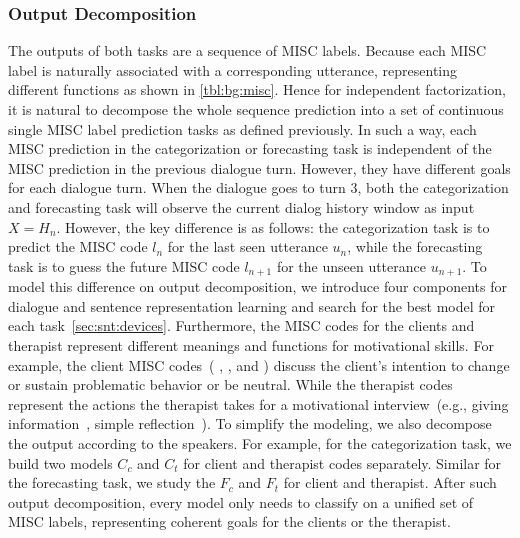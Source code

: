 \subsubsection{Output Decomposition}
\label{sssec:snt:output-decomposition}
The outputs of both tasks are a sequence of MISC labels. Because each
MISC label is naturally associated with a corresponding utterance,
representing different functions as shown in
\autoref{tbl:bg:misc}. Hence for independent factorization, it is
natural to decompose the whole sequence prediction into a set of
continuous single MISC label prediction tasks as defined
previously. In such a way, each MISC prediction in the categorization
or forecasting task is independent of the MISC prediction in the
previous dialogue turn. However, they have different goals for each
dialogue turn. When the dialogue goes to turn 3, both the
categorization and forecasting task will observe the current dialog
history window as input $X=H_{n}$. However, the key difference is as
follows: the categorization task is to predict the MISC code $l_{n}$
for the last seen utterance $u_{n}$, while the forecasting task is to
guess the future MISC code $l_{n+1}$ for the unseen utterance
$u_{n+1}$. To model this difference on output decomposition, we
introduce four components for dialogue and sentence representation
learning and search for the best model for each
task~\autoref{sec:snt:devices}. Furthermore, the MISC codes for the
clients and therapist represent different meanings and functions for
motivational skills. For example, the client MISC codes~( \SUSTAIN,
\CHANGE, and \FN) discuss the client's intention to change or sustain
problematic behavior or be neutral. While the therapist codes
represent the actions the therapist takes for a motivational
interview~(e.g., giving information~\GI, simple reflection~\RES). To
simplify the modeling, we also decompose the output according to the
speakers. For example, for the categorization task, we build two
models $C_{c}$ and $C_{t}$ for client and therapist codes
separately. Similar for the forecasting task, we study the $F_{c}$ and
$F_{t}$ for client and therapist. After such output decomposition,
every model only needs to classify on a unified set of MISC labels,
representing coherent goals for the clients or the therapist.

